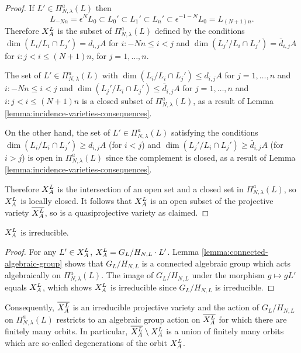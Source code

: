 \documentclass[a4paper, 11pt]{report}
\begin{document}
\begin{proof}
If $L'\in\Pi_{N,\lambda}^a(L)$ then
\begin{equation*}
L_{-Nn}=\epsilon^N L_0\subset L_0'\subset L_1'\subset L_n'\subset \epsilon^{-1-N}L_0 = L_{(N+1)n}.
\end{equation*}
Therefore $\xprod[L]{A}$ is the subset of $\Pi_{N,\lambda}^a(L)$ defined by the conditions $\dim(L_i/{L_i\cap L_j'})=d_{i,j}{A}$ for $i:-Nn\le i<j$ and $\dim(L_j'/{L_i\cap L_j'})=\bar{d}_{i,j}{A}$ for $i:j<i\le(N+1)n$, for $j=1,\ldots,n$.

The set of $L'\in\Pi_{N,\lambda}^a(L)$ with $\dim(L_i/{L_i\cap L_j'})\le d_{i,j}{A}$ for $j=1,\ldots,n$ and $i:-Nn\le i<j$ and $\dim(L_j'/{L_i\cap L_j'})\le\bar{d}_{i,j}{A}$ for $j=1,\ldots,n$ and $i:j<i\le(N+1)n$ is a closed subset of $\Pi_{N,\lambda}^a(L)$, as a result of Lemma \ref{lemma:incidence-varieties-consequences}.

On the other hand, the set of $L'\in\Pi_{N,\lambda}^a(L)$ satisfying the conditions $\dim(L_i/{L_i\cap L_j'})\geq d_{i,j}{A}$ (for $i<j$) and $\dim(L_j'/{L_i\cap L_j'})\geq\bar{d}_{i,j}{A}$ (for $i>j$) is open in $\Pi_{N,\lambda}^a(L)$ since the complement is closed, as a result of Lemma \ref{lemma:incidence-varieties-consequences}.

Therefore $\xprod[L]{A}$ is the intersection of an open set and a closed set in $\Pi_{N,\lambda}^a(L)$, so $\xprod[L]{A}$ is locally closed. It follows that $\xprod[L]{A}$ is an open subset of the projective variety $\overline{\xprod[L]{A}}$, so is a quasiprojective variety as claimed.
\end{proof}

\begin{lemma}\label{lemma:orbits-are-irreducible}
$\xprod[L]{A}$ is irreducible.
\end{lemma}

\begin{proof}
For any $L'\in\xprod[L]{A}$, $\xprod[L]{A} = G_L/{H_{N,L}}\cdot L'$. Lemma \ref{lemma:connected-algebraic-group} shows that $G_L/{H_{N,L}}$ is a connected algebraic group which acts algebraically on $\Pi_{N,\lambda}^a(L)$. The image of $G_L/{H_{N,L}}$ under the morphism $g\mapsto gL'$ equals $\xprod[L]{A}$, which shows $\xprod[L]{A}$ is irreducible since $G_L/{H_{N,L}}$ is irreducible.
\end{proof}

Consequently, $\overline{\xprod[L]{A}}$ is an irreducible projective variety and the action of $G_L/{H_{N,L}}$ on $\Pi_{N,\lambda}^a(L)$ restricts to an algebraic group action on $\overline{\xprod[L]{A}}$ for which there are finitely many orbits. In particular, $\overline{\xprod[L]{A}}\setminus\xprod[L]{A}$ is a union of finitely many orbits which are so-called degenerations of the orbit $\xprod[L]{A}$.
\end{document}
